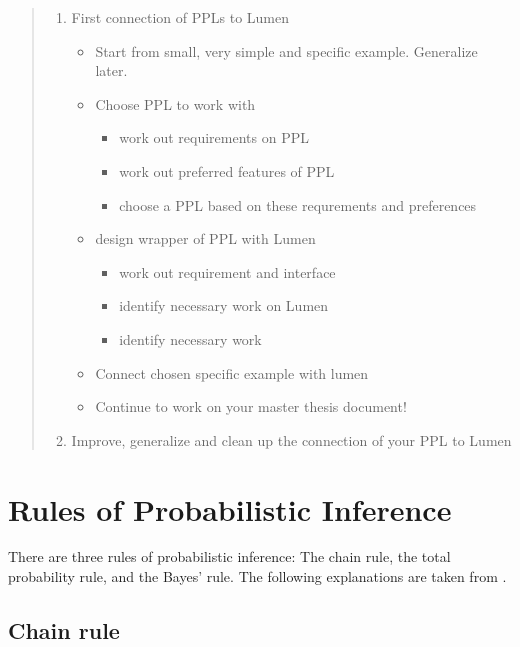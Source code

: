 \documentclass{article}
\begin{document}
\begin{abstract}
\begin{enumerate}
\begin{itemize}
        \end{itemize}
    \item First connection of PPLs to Lumen
        \begin{itemize}
        \item Start from small, very simple and specific example. Generalize later.
        \item Choose PPL to work with
	\begin {itemize}
		\item work out requirements on PPL
		\item work out preferred features of PPL
		\item choose a PPL based on these requrements and preferences
	\end{itemize}
        \item design wrapper of PPL with Lumen
	\begin{itemize}
		\item work out requirement and interface
		\item identify necessary work on Lumen
		\item identify necessary work
	\end{itemize}
        \item Connect chosen specific example with lumen
        \item Continue to work on your master thesis document!
        \end{itemize}
    \item Improve, generalize and clean up the connection of your PPL to Lumen
\end{enumerate}



\end{abstract}

\tableofcontents


\printglossaries
\section{Rules of Probabilistic Inference}

There are three rules of probabilistic inference: The chain rule, the total probability rule, and the Bayes' rule. The following explanations are taken from \cite{9781617292330}.

\subsection{Chain rule}
\end{document}
